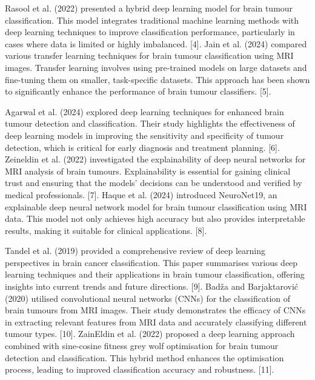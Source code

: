 \documentclass[conference]{IEEEtran}
\begin{document}
Rasool et al. (2022) presented a hybrid deep learning model for brain tumour classification. This model integrates traditional machine learning methods with deep learning techniques to improve classification performance, particularly in cases where data is limited or highly imbalanced. [4]. Jain et al. (2024) compared various transfer learning techniques for brain tumour classification using MRI images. Transfer learning involves using pre-trained models on large datasets and fine-tuning them on smaller, task-specific datasets. This approach has been shown to significantly enhance the performance of brain tumour classifiers. [5].

Agarwal et al. (2024) explored deep learning techniques for enhanced brain tumour detection and classification. Their study highlights the effectiveness of deep learning models in improving the sensitivity and specificity of tumour detection, which is critical for early diagnosis and treatment planning. [6]. Zeineldin et al. (2022) investigated the explainability of deep neural networks for MRI analysis of brain tumours. Explainability is essential for gaining clinical trust and ensuring that the models' decisions can be understood and verified by medical professionals. [7]. Haque et al. (2024) introduced NeuroNet19, an explainable deep neural network model for brain tumour classification using MRI data. This model not only achieves high accuracy but also provides interpretable results, making it suitable for clinical applications. [8].

Tandel et al. (2019) provided a comprehensive review of deep learning perspectives in brain cancer classification. This paper summarises various deep learning techniques and their applications in brain tumour classification, offering insights into current trends and future directions. [9]. Badža and Barjaktarović (2020) utilised convolutional neural networks (CNNs) for the classification of brain tumours from MRI images. Their study demonstrates the efficacy of CNNs in extracting relevant features from MRI data and accurately classifying different tumour types. [10]. ZainEldin et al. (2022) proposed a deep learning approach combined with sine-cosine fitness grey wolf optimisation for brain tumour detection and classification. This hybrid method enhances the optimisation process, leading to improved classification accuracy and robustness. [11].
\end{document}
